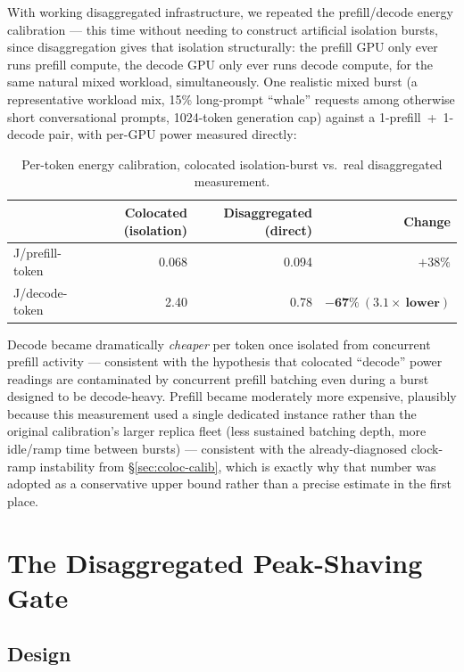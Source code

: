\documentclass[sigconf,review,anonymous]{acmart}
\begin{document}
With working disaggregated infrastructure, we repeated the prefill/decode energy calibration
--- this time without needing to construct artificial isolation bursts, since disaggregation
gives that isolation structurally: the prefill GPU only ever runs prefill compute, the decode
GPU only ever runs decode compute, for the same natural mixed workload, simultaneously. One
realistic mixed burst (a representative workload mix, 15\% long-prompt ``whale'' requests
among otherwise short conversational prompts, 1024-token generation cap) against a
1-prefill~+~1-decode pair, with per-GPU power measured directly:

\begin{table}[t]
  \caption{Per-token energy calibration, colocated isolation-burst vs.\ real disaggregated
    measurement.}
  \label{tab:calib}
  \footnotesize
  \begin{tabular}{@{}lrrr@{}}
    \toprule
     & Colocated (isolation) & Disaggregated (direct) & Change \\
    \midrule
    J/prefill-token & 0.068 & 0.094 & $+38\%$ \\
    J/decode-token  & 2.40  & 0.78  & $\mathbf{-67\%~(3.1\times{}~lower)}$ \\
    \bottomrule
  \end{tabular}
\end{table}

Decode became dramatically \emph{cheaper} per token once isolated from concurrent prefill
activity --- consistent with the hypothesis that colocated ``decode'' power readings are
contaminated by concurrent prefill batching even during a burst designed to be decode-heavy.
Prefill became moderately more expensive, plausibly because this measurement used a single
dedicated instance rather than the original calibration's larger replica fleet (less
sustained batching depth, more idle/ramp time between bursts) --- consistent with the
already-diagnosed clock-ramp instability from \S\ref{sec:coloc-calib}, which is exactly why
that number was adopted as a conservative upper bound rather than a precise estimate in the
first place.

\section{The Disaggregated Peak-Shaving Gate}
\label{sec:disagggate}

\subsection{Design}
\label{sec:design}
\end{document}
